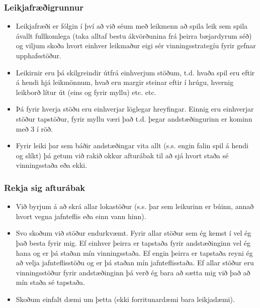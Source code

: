 \documentclass{beamer}
\begin{document}
\begin{frame}
\frametitle{Leikjafræðigrunnur}

\begin{itemize}

\item<1-> Leikjafræði er fólgin í því að við séum með leikmenn að spila leik sem spila ávallt fullkomlega (taka alltaf bestu ákvörðunina frá þeirra bæjardyrum séð) og viljum skoða hvort einhver leikmaður eigi sér vinningsstrategíu fyrir gefnar upphafsstöður.

\item<2-> Leikirnir eru þá skilgreindir útfrá einhverjum stöðum, t.d. hvaða spil eru eftir á hendi hjá leikmönnum, hvað eru margir steinar eftir í hrúgu, hvernig leikborð lítur út (eins og fyrir myllu) etc. etc.

\item<3-> Þá fyrir hverja stöðu eru einhverjar löglegar hreyfingar. Einnig eru einhverjar stöður tapstöður, fyrir myllu væri það t.d. þegar andstæðingurinn er kominn með 3 í röð.

\item<4-> Fyrir leiki þar sem báðir andstæðingar vita allt (s.s. engin falin spil á hendi og slíkt) þá getum við rakið okkur afturábak til að sjá hvort staða sé vinningsstaða eða ekki.

\end{itemize}

\end{frame}

\begin{frame}
\frametitle{Rekja sig afturábak}

\begin{itemize}

\item<1-> Við byrjum á að skrá allar lokastöður (s.s. þar sem leikurinn er búinn, annað hvort vegna jafnteflis eða einn vann hinn).

\item<2-> Svo skoðum við stöður endurkvæmt. Fyrir allar stöður sem ég kemst í vel ég það besta fyrir mig. Ef einhver þeirra er tapstaða fyrir andstæðinginn vel ég hana og er þá staðan mín vinningsstaða. Ef engin þeirra er tapstaða reyni ég að velja jafnteflisstöðu og er þá staðan mín jafnteflisstaða. Ef allar stöður eru vinningsstöður fyrir andstæðinginn þá verð ég bara að sætta mig við það að mín staða sé tapstaða.

\item<3-> Skoðum einfalt dæmi um þetta (ekki forritunardæmi bara leikjadæmi).

\end{itemize}

\end{frame}
\end{document}
